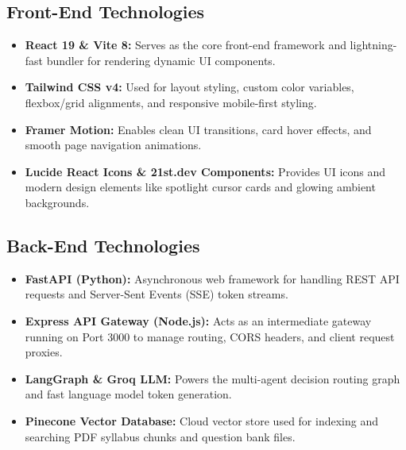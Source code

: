 \subsection{Front-End Technologies}
\begin{itemize}
    \item \textbf{React 19 \& Vite 8:} Serves as the core front-end framework and lightning-fast bundler for rendering dynamic UI components.
    \item \textbf{Tailwind CSS v4:} Used for layout styling, custom color variables, flexbox/grid alignments, and responsive mobile-first styling.
    \item \textbf{Framer Motion:} Enables clean UI transitions, card hover effects, and smooth page navigation animations.
    \item \textbf{Lucide React Icons \& 21st.dev Components:} Provides UI icons and modern design elements like spotlight cursor cards and glowing ambient backgrounds.
\end{itemize}

\subsection{Back-End Technologies}
\begin{itemize}
    \item \textbf{FastAPI (Python):} Asynchronous web framework for handling REST API requests and Server-Sent Events (SSE) token streams.
    \item \textbf{Express API Gateway (Node.js):} Acts as an intermediate gateway running on Port 3000 to manage routing, CORS headers, and client request proxies.
    \item \textbf{LangGraph \& Groq LLM:} Powers the multi-agent decision routing graph and fast language model token generation.
    \item \textbf{Pinecone Vector Database:} Cloud vector store used for indexing and searching PDF syllabus chunks and question bank files.
\end{itemize}
